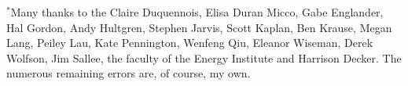 \documentclass[11pt,letterpaper,oneside]{article}
\begin{document}
\vspace{3in plus 2in minus 1.7in}
{\footnotesize
\noindent
$^*$Many thanks to the Claire Duquennois, Elisa Duran Micco, Gabe Englander, Hal Gordon, Andy Hultgren, Stephen Jarvis, Scott Kaplan, Ben Krause, Megan Lang, Peiley Lau, Kate Pennington, Wenfeng Qiu, Eleanor Wiseman, Derek Wolfson, Jim Sallee, the faculty of the Energy Institute and Harrison Decker.
The numerous remaining errors are, of course, my own.
}
%
%
%
%
%
\end{document}
